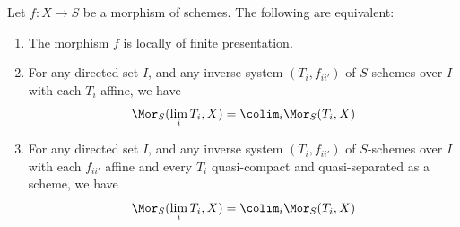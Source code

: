 %

\begin{proposition}
\label{proposition-characterize-locally-finite-presentation}
\begin{reference}
\cite[IV, Proposition 8.14.2]{EGA}
\end{reference}
Let $f : X \to S$ be a morphism of schemes.
The following are equivalent:
\begin{enumerate}
\item The morphism $f$ is locally of finite presentation.
\item For any directed set $I$, and any
inverse system $(T_i, f_{ii'})$ of $S$-schemes over $I$
with each $T_i$ affine, we have
$$
\Mor_S(\lim_i T_i, X) =
\colim_i \Mor_S(T_i, X)
$$
\item For any directed set $I$, and any
inverse system $(T_i, f_{ii'})$ of $S$-schemes over $I$
with each $f_{ii'}$ affine and every $T_i$ quasi-compact and
quasi-separated as a scheme, we have
$$
\Mor_S(\lim_i T_i, X) =
\colim_i \Mor_S(T_i, X)
$$
\end{enumerate}
\end{proposition}

